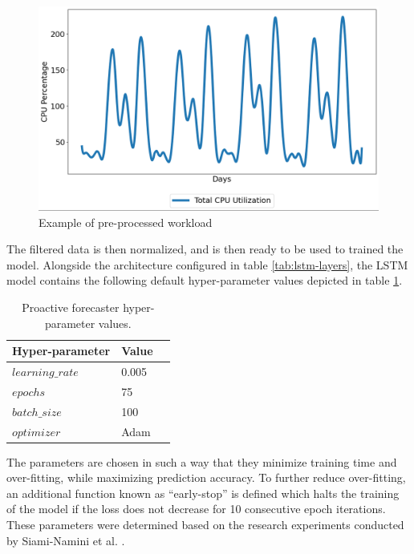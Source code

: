 \begin{figure}[htb]
    \centering
    \caption{Example of pre-processed workload}
    \label{fig:lstm-smooth-data}
    \includegraphics[width=1.0\linewidth]{Figures/LSTM-Smooth-Data.png}
\end{figure}

The filtered data is then normalized, and is then ready to be used to trained the model. Alongside the architecture configured in table \ref{tab:lstm-layers}, the LSTM model contains the following default hyper-parameter values depicted in table \ref{tab:lstm-params}.


\begin{table}
    \caption{Proactive forecaster hyper-parameter values.}\label{tab:lstm-params}
    \centering
    \begin{tabular}{|l|l|l|}
        \hline
        Hyper-parameter & Value\\
        \hline
        $learning\_rate$ & 0.005\\
        $epochs$         & 75\\
        $batch\_size$    & 100\\
        $optimizer$      & Adam \cite{diederik2014adam}\\
        \hline
    \end{tabular}
\end{table}

The parameters are chosen in such a way that they minimize training time and over-fitting, while maximizing prediction accuracy. To further reduce over-fitting, an additional function known as ``early-stop'' is defined which halts the training of the model if the loss does not decrease for 10 consecutive epoch iterations. These parameters were determined based on the research experiments conducted by Siami-Namini et al. \cite{siami2018comparison}.\par

